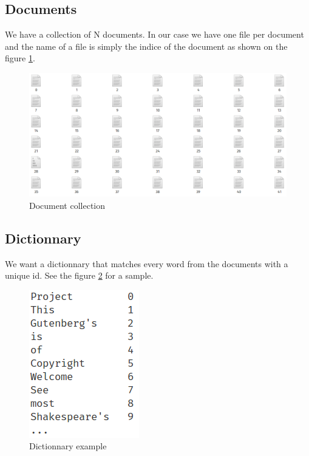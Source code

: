 \documentclass[12pt,french,titlepage]{article}
\begin{document}
\subsection{Documents}
We have a collection of N documents. In our case we have one file per document and the name of a file is simply the indice of the document as shown on the figure \ref{fig:documents}.
\begin{figure}[H]
    \centering
    \includegraphics[scale=0.45]{images/dataset}
    \caption{Document collection}
    \label{fig:documents}
\end{figure}
\subsection{Dictionnary}
We want a dictionnary that matches every word from the documents with a unique id. See the figure \ref{fig:dictionnary} for a sample.
\begin{figure}[H]
    \centering
    \includegraphics[scale=0.75]{images/dictionnary}
    \caption{Dictionnary example}
    \label{fig:dictionnary}
\end{figure}
\end{document}
